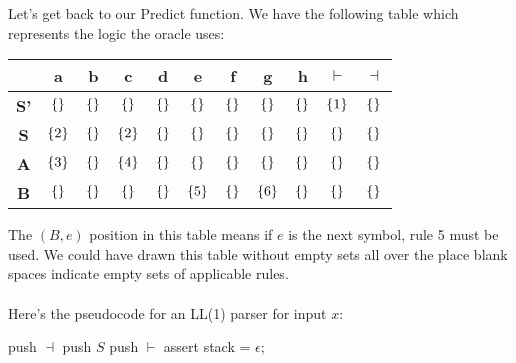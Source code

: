 \documentclass[]{article}
\DeclarePairedDelimiter{\set}{\lbrace}{\rbrace}
\theoremstyle{definition}
\begin{document}
				Let's get back to our Predict function. We have the following table which represents the logic the oracle uses:
				\begin{center}
					\begin{tabular}{|c|c|c|c|c|c|c|c|c|c|c|}
						\hline
						& \textbf{a} & \textbf{b} & \textbf{c} & \textbf{d} & \textbf{e} & \textbf{f} & \textbf{g} & \textbf{h} & $\boldsymbol \vdash$ & $\boldsymbol \dashv$ \\ \hline
						\textbf{S'} & $\set{}$ & $\set{}$ & $\set{}$ & $\set{}$ & $\set{}$ & $\set{}$ & $\set{}$ & $\set{}$ & $\set{1}$ & $\set{}$ \\
						\textbf{S} & $\set{2}$ & $\set{}$ & $\set{2}$ & $\set{}$ & $\set{}$ & $\set{}$ & $\set{}$ & $\set{}$ & $\set{}$ & $\set{}$ \\
						\textbf{A} & $\set{3}$ & $\set{}$ & $\set{4}$ & $\set{}$ & $\set{}$ & $\set{}$ & $\set{}$ & $\set{}$ & $\set{}$ & $\set{}$ \\
						\textbf{B} & $\set{}$ & $\set{}$ & $\set{}$ & $\set{}$ & $\set{5}$ & $\set{}$ & $\set{6}$ & $\set{}$ & $\set{}$ & $\set{}$ \\ \hline
					\end{tabular}
				\end{center}
				
				The $(B, e)$ position in this table means if $e$ is the next symbol, rule 5 must be used. We could have drawn this table without empty sets all over the place \textendash{} blank spaces indicate empty sets of applicable rules.
				\\ \\
				Here's the pseudocode for an LL(1) parser for input $x$: \\
				\begin{algorithm}[H]
					push $\dashv$\;
					push $S$\;
					push $\vdash$\;
					assert stack = $\epsilon$;
				\end{algorithm}
\end{document}
